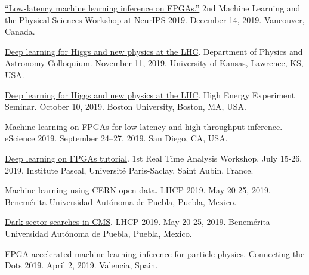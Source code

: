 \documentclass[11pt]{res}
\begin{document}
\begin{resume}


  \href{https://ml4physicalsciences.github.io/2019/files/NeurIPS_ML4PS_2019_74.pdf}{``Low-latency machine learning inference on FPGAs.''} 2nd Machine Learning and the Physical Sciences Workshop at NeurIPS 2019.  December 14, 2019. Vancouver, Canada.

  \href{https://physics.drupal.ku.edu/calendar/colloquia#/?i=2}{Deep learning for Higgs and new physics at the LHC}. Department of Physics and Astronomy Colloquium. November 11, 2019. University of Kansas, Lawrence, KS, USA.

  \href{http://physics.bu.edu/events/show/2204}{Deep learning for Higgs and new physics at the LHC}. High Energy Experiment Seminar. October 10, 2019. Boston University, Boston, MA, USA.

  \href{https://escience2019.sdsc.edu/program}{Machine learning on FPGAs for low-latency and high-throughput inference}. eScience 2019. September 24–27, 2019. San Diego, CA, USA.

  \href{https://indico.cern.ch/event/793125/contributions/3495251/}{Deep learning on FPGAs tutorial}. 1st Real Time Analysis Workshop. July 15-26, 2019. Institute Pascal, Universit\'{e} Paris-Saclay, Saint Aubin, France.

  \href{https://indico.cern.ch/event/687651/contributions/3428206/}{Machine learning using CERN open data}. LHCP 2019. May 20-25, 2019. Benem\'{e}rita Universidad Aut\'{o}noma de Puebla, Puebla, Mexico.

  \href{https://indico.cern.ch/event/687651/contributions/3426898/}{Dark sector searches in CMS}. LHCP 2019. May 20-25, 2019. Benem\'{e}rita Universidad Aut\'{o}noma de Puebla, Puebla, Mexico.

  \href{https://indico.cern.ch/event/742793/contributions/3274392/}{FPGA-accelerated machine learning inference for particle physics}. Connecting the Dots 2019. April 2, 2019. Valencia, Spain.


\end{resume}
\end{document}
